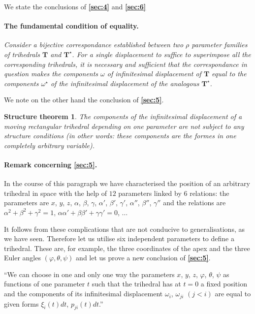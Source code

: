 \documentclass[leqno,11pt]{book}
\makeatletter
\numberwithin{equation}{chapter}
\theoremstyle{shape1}
\theoremstyle{shapesmall}
\let\old@phi\phi
\let\old@varphi\varphi
\let\phi\old@varphi
\let\varphi\old@phi
\newcommand{\fsref}[1]{{\rm\textsection\textbf{\ref{sec:#1}}}}
\makeatother
\begin{document}
We state the conclusions of \fsref{4} and \fsref{6}

\paragraph{The fundamental condition of equality.}
\label{sec:7}
\emph{Consider a bijective correspondance established between two $\rho$ parameter families of trihedrals $\mathbf{T}$ and $\mathbf{T}^{\star}$. For a single displacement to suffice to superimpose all the corresponding trihedrals, it is necessary and sufficient that the correspondance in question makes the components $\omega$ of infinitesimal displacement of $\mathbf{T}$ equal to the components $\omega^{\star}$ of the infinitesimal displacement of the analogous $\mathbf{T}^{\star}$.}

We note on the other hand the conclusion of \fsref{5}.

\theoremstyle{shape1}
\newtheorem*{strthm}{Structure theorem}
\begin{strthm}
  The components of the infinitesimal displacement of a moving rectangular trihedral depending on one parameter are not subject to any structure conditions \emph{(in other words: these components are the formes in one completely arbitrary variable)}.
\end{strthm}

\paragraph{Remark concerning \fsref{5}.}
\label{sec:8}
In the course of this paragraph we have characterised the position of an arbitrary trihedral in space with the help of $12$ parameters linked by $6$ relations: the parameters are $x$, $y$, $z$, $\alpha$, $\beta$, $\gamma$, $\alpha'$, $\beta'$, $\gamma'$, $\alpha''$, $\beta''$, $\gamma''$ and the relations are $\alpha^{2}+\beta^{2}+\gamma^{2}=1$, $\alpha\alpha'+\beta\beta'+\gamma\gamma'=0$, $\dots$

It follows from these complications that are not conducive to generalisations, as we have seen. Therefore let us utilise six independent parameters to define a trihedral. These are, for example, the three coordinates of the apex and the three Euler angles $(\phi, \theta, \psi)$ and let us prove a new conclusion of \fsref{5}.

``We can choose in one and only one way the parameters $x$, $y$, $z$, $\phi$, $\theta$, $\psi$ as functions of one parameter $t$ such that the trihedral has at $t=0$ a fixed position and the components of its infinitesimal displacement $\omega_{i}$, $\omega_{ji}$ $(j<i)$ are equal to given forms $\xi_{i}(t)dt$, $p_{ji}(t)dt$.''
\end{document}
